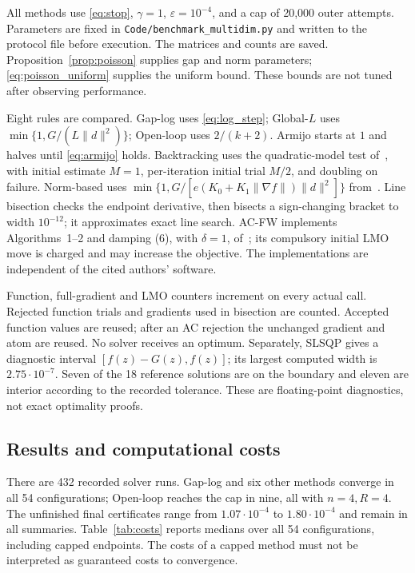 All methods use \eqref{eq:stop}, $\gamma=1$, $\varepsilon=10^{-4}$,
and a cap of 20,000 outer attempts. Parameters are fixed in
\texttt{Code/benchmark\_multidim.py} and written to the protocol file
before execution. The matrices and counts are saved.
Proposition~\ref{prop:poisson} supplies gap and norm parameters;
\eqref{eq:poisson_uniform} supplies the uniform bound.
These bounds are not tuned after observing performance.

Eight rules are compared. Gap-log uses \eqref{eq:log_step};
Global-$L$ uses $\min\{1,G/(L\|d\|^2)\}$; Open-loop uses $2/(k+2)$.
Armijo starts at $1$ and halves until \eqref{eq:armijo} holds.
Backtracking uses the quadratic-model test of~\cite{pedregosa},
with initial estimate $M=1$, per-iteration initial trial $M/2$,
and doubling on failure. Norm-based uses
$\min\{1,G/[e(K_0+K_1\|\nabla f\|)\|d\|^2]\}$ from~\cite{vyguzov}.
Line bisection checks the endpoint derivative, then bisects a
sign-changing bracket to width $10^{-12}$; it approximates exact
line search. AC-FW implements Algorithms~1--2 and damping (6),
with $\delta=1$, of~\cite{acfw}; its compulsory initial LMO move is
charged and may increase the objective. The implementations are
independent of the cited authors' software.

Function, full-gradient and LMO counters increment on every actual call.
Rejected function trials and gradients used in bisection are counted.
Accepted function values are reused; after an AC rejection the unchanged
gradient and atom are reused. No solver receives an optimum.
Separately, SLSQP gives a diagnostic interval $[f(z)-G(z),f(z)]$;
its largest computed width is $2.75\cdot10^{-7}$.
Seven of the 18 reference solutions are on the boundary and eleven
are interior according to the recorded tolerance. These are
floating-point diagnostics, not exact optimality proofs.

\subsection{Results and computational costs}
There are 432 recorded solver runs. Gap-log and six other methods
converge in all 54 configurations; Open-loop reaches the cap in nine,
all with $n=4,R=4$. The unfinished final certificates range from
$1.07\cdot10^{-4}$ to $1.80\cdot10^{-4}$ and remain in all summaries.
Table~\ref{tab:costs} reports medians over all 54 configurations,
including capped endpoints. The costs of a capped method must not
be interpreted as guaranteed costs to convergence.

